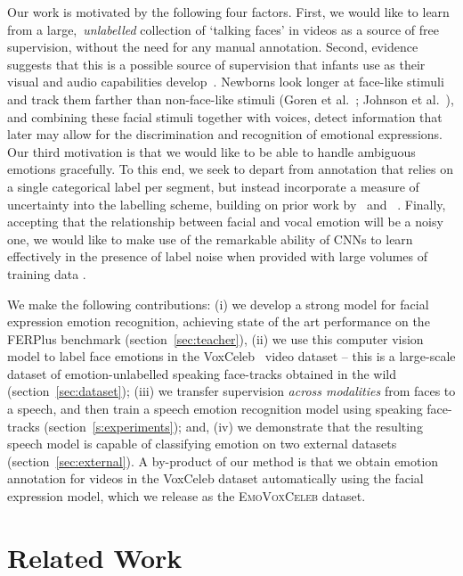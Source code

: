 \documentclass[sigconf]{acmart}
\newcommand{\datasetName}{\textsc{EmoVoxCeleb}}
\begin{document}
Our work is motivated by the following four factors. First, we would like to learn from a large,~\textit{unlabelled} collection of `talking faces' in videos as a source of free supervision, without the need for any manual annotation. Second, evidence suggests that this is a possible source of supervision that infants use as their visual and audio capabilities develop~\cite{grossmann2010development}. Newborns look longer at face-like stimuli and track them farther than non-face-like stimuli (Goren et al.~\cite{goren1975visual}; Johnson et al.~\cite{johnson1991newborns}), and combining these facial stimuli together with voices, detect information that later may allow for the discrimination and recognition of emotional expressions. Our third motivation is that we would like to be able to handle ambiguous emotions gracefully.  To this end, we seek to depart from annotation that relies on a single categorical label per segment, but instead incorporate a measure of uncertainty into the labelling scheme, building on prior work by~\cite{zhao2017learning} and ~\cite{han2017hard}.  Finally, accepting that the relationship between facial and vocal emotion will be a noisy one, we would like to make use of the remarkable ability of CNNs to learn effectively in the presence of label noise when provided with large volumes of training data \cite{rolnick2017deep, mahajan2018exploring}.

We make the following contributions: (i) we develop a strong model for
facial expression emotion recognition, achieving state of the art
performance on the FERPlus benchmark (section~\ref{sec:teacher}), (ii) we use this computer vision
model to label face emotions in the VoxCeleb~\cite{Nagrani17} video dataset -- this is
a large-scale dataset of emotion-unlabelled speaking face-tracks
obtained in the wild (section~\ref{sec:dataset}); (iii) we 
 transfer supervision \textit{across modalities} from faces to a speech, and then train a
speech emotion recognition model using speaking face-tracks (section~\ref{s:experiments});
 and,  (iv) we demonstrate that the resulting
speech model is capable of classifying emotion on two external
datasets (section~\ref{sec:external}).  A by-product of our method is that we obtain emotion
annotation for videos in the VoxCeleb dataset automatically using the facial expression model, which we release as the \datasetName{} dataset.
 \section{Related Work}\label{sec:related}
\end{document}

